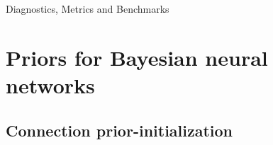 \documentclass[9pt]{beamer}
\begin{document}
\begin{frame}{Diagnostics, Metrics and Benchmarks}
\begin{itemize}[<+->]
%
\end{itemize}
\end{frame}


%
%


\section{Priors for Bayesian neural networks}

\subsection{Connection prior-initialization}
\end{document}
